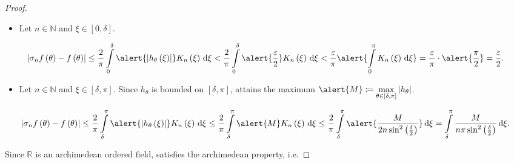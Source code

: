 \begin{frame}[allowframebreaks]
\begin{proof}
		\framebreak

		\begin{itemize}
			\item

			      Let $n\in\mathds{N}$ and $\xi\in\left[0,\delta\right]$.

		\end{itemize}

		\begin{equation*}
			\left|
			\sigma_{n}f\left(\theta\right)-
			f\left(\theta\right)
			\right|
			\leq
			\frac{2}{\pi}
			\int\limits_{0}^{\delta}
			\alert{
				\left|
				h_{\theta}\left(\xi\right)
				\right|
			}
			K_{n}\left(\xi\right)
			\dl\xi
			<
			\frac{2}{\pi}
			\int\limits_{0}^{\delta}
			\alert{
				\frac{\varepsilon}{2}
			}
			K_{n}\left(\xi\right)
			\dl\xi
			<
			\frac{\varepsilon}{\pi}
			\alert{
				\int\limits_{0}^{\pi}
				K_{n}\left(\xi\right)
				\dl\xi
			}
			=\frac{\varepsilon}{\pi}\cdot
			\alert{\frac{\pi}{2}}=
			\frac{\varepsilon}{2}.
		\end{equation*}

		\begin{itemize}
			\item

			      Let $n\in\mathds{N}$ and $\xi\in\left[\delta,\pi\right]$.
			      Since $h_{\theta}$ is bounded on
			      $\left[\delta,\pi\right]$, attains the maximum
			      \begin{math}
				      \alert{M}
				      \coloneqq
				      \max\limits_{\theta\in\left[\delta,\pi\right]}
				      \left|
				      h_{\theta}
				      \right|
			      \end{math}.
		\end{itemize}

		\begin{equation*}
			\left|
			\sigma_{n}f\left(\theta\right)-
			f\left(\theta\right)
			\right|
			\leq
			\frac{2}{\pi}
			\int\limits_{\delta}^{\pi}
			\alert{
				\left|
				h_{\theta}\left(\xi\right)
				\right|
			}
			K_{n}\left(\xi\right)
			\dl\xi
			\leq
			\frac{2}{\pi}
			\int\limits_{\delta}^{\pi}
			\alert{M}
			K_{n}\left(\xi\right)
			\dl\xi
			\leq
			\frac{2}{\pi}
			\int\limits_{\delta}^{\pi}
			\alert{
				\frac{M}{
					2n\sin^{2}\left(\frac{\delta}{2}\right)
				}
			}
			\dl\xi=
			\int\limits_{\delta}^{\pi}
			\frac{M}{n\pi\sin^{2}\left(\frac{\delta}{2}\right)}
			\dl\xi.
		\end{equation*}

		Since $\mathds{R}$ is an \alert{archimedean} ordered field,
		satisfies the \alert{archimedean property}, i.e.


\end{proof}
\end{frame}
